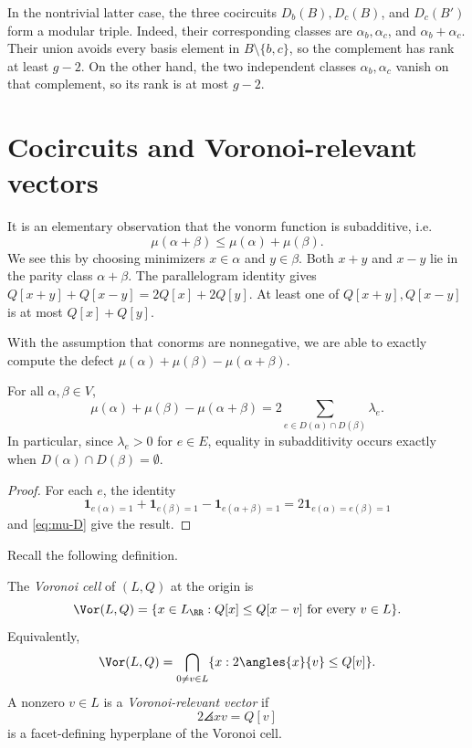 \documentclass[11pt,letterpaper]{amsart}
\begin{document}
In the nontrivial latter case, the three cocircuits $D_b(B),D_c(B)$, and $D_c(B')$ form a modular triple. Indeed, their corresponding classes are $\alpha_b,\alpha_c$, and $\alpha_b+\alpha_c$. Their union avoids every basis element in $B\setminus\{b,c\}$, so the complement has rank at least $g-2$. On the other hand, the two independent classes $\alpha_b,\alpha_c$ vanish on that complement, so its rank is at most $g-2$.



\section{Cocircuits and Voronoi-relevant vectors}\label{sec:cocircuits}



It is an elementary observation that the vonorm function is
subadditive, i.e. $$\mu(\alpha + \beta) \leq \mu(\alpha) + \mu(\beta).$$ We see this by choosing minimizers $x\in\alpha$ and $y\in\beta$.  Both $x+y$ and $x-y$ lie in the parity class $\alpha+\beta$.  The parallelogram identity gives
$Q[x+y]+Q[x-y]=2Q[x]+2Q[y]$. At least one of $Q[x+y],Q[x-y]$ is at most $Q[x]+Q[y]$.

With the assumption that conorms are nonnegative, we are able to exactly compute the defect $\mu(\alpha) + \mu(\beta) - \mu(\alpha + \beta)$.

\begin{lemma}\label{lem:defect}
For all $\alpha,\beta\in V$,
\begin{equation*}
  \mu(\alpha)+\mu(\beta)-\mu(\alpha+\beta)
  =2\sum_{e\in D(\alpha)\cap D(\beta)}\lambda_e.
\end{equation*}
In particular, since $\lambda_e>0$ for $e\in E$, equality in subadditivity occurs exactly when $D(\alpha)\cap D(\beta)=\emptyset$.
\end{lemma}

\begin{proof}
For each $e$, the identity
\[
  \mathbf 1_{e(\alpha)=1}+\mathbf 1_{e(\beta)=1}
  -\mathbf 1_{e(\alpha+\beta)=1}
  =2\mathbf 1_{e(\alpha)=e(\beta)=1}
\]
and \eqref{eq:mu-D} give the result.
\end{proof}

Recall the following definition.
\begin{definition}\label{def:vcell}
The \emph{Voronoi cell} of $(L,Q)$ at the origin is
\[
  \Vor(L,Q)=\{x\in L_{\RR}:Q[x]\le Q[x-v]\text{ for every }v\in L\}.
\]
Equivalently,
\[
  \Vor(L,Q)=
  \bigcap_{0\ne v\in L}
  \{x:2\angles{x}{v}\le Q[v]\}.
\]
A nonzero $v\in L$ is a \emph{Voronoi-relevant vector} if
\[
  2\angles{x}{v}=Q[v]
\]
is a facet-defining hyperplane of the Voronoi cell.
\end{definition}
 
\end{document}
